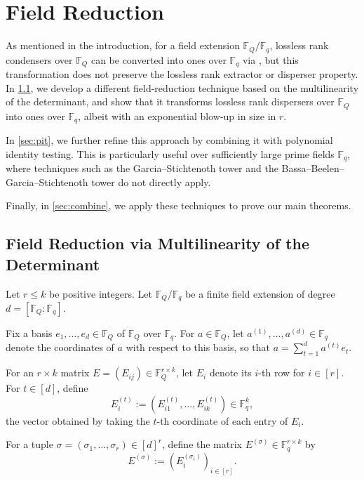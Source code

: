 \documentclass[11pt]{article}
\newcommand{\rank}{\mathrm{rank}}
\newcommand{\F}{\mathbb{F}}
\begin{document}
\section{Field Reduction}\label{sec:concatenation}

As mentioned in the introduction, for a field extension $\F_Q/\F_q$, lossless rank condensers over $\F_Q$ can be converted into ones over $\F_q$ via \cite[Proposition~8.5]{FG15}, but this transformation does not preserve the lossless rank extractor or disperser property. In \cref{sec:det}, we develop a different field-reduction technique based on the multilinearity of the determinant, and show that it transforms lossless rank dispersers over $\F_Q$ into ones over $\F_q$, albeit with an exponential blow-up in size in $r$.

In \cref{sec:pit}, we further refine this approach by combining it with polynomial identity testing. This is particularly useful over sufficiently large prime fields $\F_q$, where techniques such as the Garcia--Stichtenoth tower and the Bassa--Beelen--Garcia--Stichtenoth tower do not directly apply.

Finally, in \cref{sec:combine}, we apply these techniques to prove our main theorems.

\subsection{Field Reduction via Multilinearity of the Determinant}\label{sec:det}

Let $r\leq k$ be positive integers.
Let $\F_Q/\F_q$ be a finite field extension of degree $d=[\F_Q:\F_q]$.

Fix a basis $e_1,\dots,e_d\in \F_Q$ of $\F_Q$ over $\F_q$.
For $a\in\F_Q$, let $a^{(1)},\dots,a^{(d)}\in\F_q$ denote the coordinates of $a$ with respect to this basis, so that $a=\sum_{t=1}^d a^{(t)} e_t$.

For an $r\times k$ matrix $E=(E_{ij})\in \F_Q^{r\times k}$, let $E_i$ denote its $i$-th row for $i\in [r]$. 
For $t\in [d]$, define
\[
E_i^{(t)} := (E_{i1}^{(t)},\dots,E_{ik}^{(t)})\in \F_q^k,
\]
the vector obtained by taking the $t$-th coordinate of each entry of $E_i$.

For a tuple $\sigma=(\sigma_1,\dots,\sigma_r)\in [d]^r$, define the matrix $E^{(\sigma)}\in \F_q^{r\times k}$ by
\[
E^{(\sigma)} := (E_i^{(\sigma_i)})_{i\in [r]}.
\]
\end{document}
